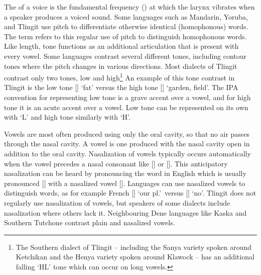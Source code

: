 The  of a voice is the fundamental frequency (\!\Fzero) at which the larynx vibrates when a speaker produces a voiced sound. Some languages such as Mandarin, Yoruba, and Tlingit use pitch to differentiate otherwise identical (homophonous) words. The term  refers to this regular use of pitch to distinguish  homophonous words. Like length, tone functions as an additional articulation that is present with every vowel. Some languages contrast several different tones, including contour tones where the pitch changes in various directions. Most dialects of Tlingit contrast only two tones, low and high\footnote{The Southern dialect of Tlingit – including the Sanya variety spoken around Ketchikan and the Henya variety spoken around Klawock – has an additional falling ‘HL’ tone which can occur on long vowels.}  An example of this tone contrast in Tlingit is the low tone  [] ‘fat’ versus the high tone  [] ‘garden, field’. The IPA convention for representing low tone is a grave accent  over a vowel, and for high tone it is an acute accent  over a vowel. Low tone can be represented on its own with ‘L’ and high tone similarly with ‘H’.

Vowels are most often produced using only the oral cavity, so that no air passes through the nasal cavity. A  vowel is one produced with the nasal cavity open in addition to the oral cavity. Nasalization of vowels typically occurs automatically when the vowel precedes a nasal consonant like [] or []. This anticipatory nasalization can be heard by pronouncing the word  in English which is usually pronounced [] with a nasalized vowel []. Languages can use nasalized vowels to distinguish words, as for example French  [] ‘our pl.’\ versus  [] ‘no’. Tlingit does not regularly use nasalization of vowels, but speakers of some dialects include nasalization where others lack it. Neighbouring Dene languages like Kaska and Southern Tutchone contrast plain and nasalized vowels.

